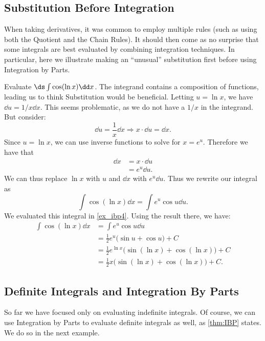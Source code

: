 \subsection{Substitution Before Integration}

When taking derivatives, it was common to employ multiple rules (such as using both the Quotient and the Chain Rules). It should then come as no surprise that some integrals are best evaluated by combining integration techniques. In particular, here we illustrate making an ``unusual'' substitution first before using Integration by Parts.

\begin{example}\label{ex_ibp8}
Evaluate $\ds \int \cos(\ln x)\dd x$.
\solution
The integrand contains a composition of functions, leading us to think Substitution would be beneficial. Letting $u=\ln x$, we have $\dd u = 1/x\dd x$. This seems problematic, as we do not have a $1/x$ in the integrand. But consider:
\[\dd u = \frac 1x\dd x \Rightarrow x\cdot\dd u = \dd x.\]
Since $u = \ln x$, we can use inverse functions to solve for $x = e^u$. Therefore we have that
\begin{align*}
\dd x &= x\cdot \dd u \\
		&= e^u\dd u.
\end{align*}
We can thus replace $\ln x$ with $u$ and $\dd x$ with $e^u\dd u$. Thus we rewrite our integral as 
\[\int \cos(\ln x)\dd x = \int e^u\cos u\dd u.\]
We evaluated this integral in \autoref{ex_ibp4}. Using the result there, we have:
\begin{align*}
\int \cos(\ln x)\dd x &= \int e^u\cos u\dd u \\
				&= \frac12e^u\bigl(\sin u + \cos u\bigr) + C \\
				&= \frac12e^{\ln x} \bigl(\sin(\ln x) + \cos (\ln x)\bigr)+C\\
				&= \frac12x \bigl(\sin(\ln x) + \cos (\ln x)\bigr)+C.
\end{align*}
\end{example}

\subsection{Definite Integrals and Integration By Parts}

So far we have focused only on evaluating indefinite integrals. Of course, we can use Integration by Parts to evaluate definite integrals as well, as \autoref{thm:IBP} states. We do so in the next example.

